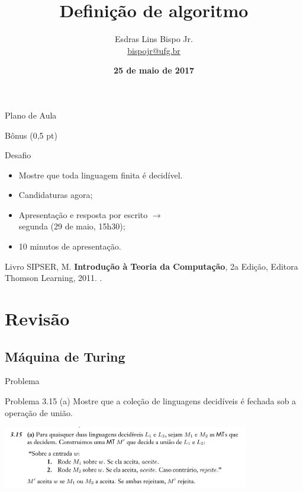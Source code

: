 \documentclass[xcolor=dvipsnames,table]{beamer}
\title{Definição de algoritmo}
\author{
  Esdras Lins Bispo Jr. \\ \url{bispojr@ufg.br}
  }
\institute{
  Teoria da Computação \\Bacharelado em Ciência da Computação}
\date{\textbf{25 de maio de 2017} }
\begin{document}
	\begin{frame}
		\titlepage
	\end{frame}

	\AtBeginSection{
		\begin{frame}{Sumário}%
    		\tableofcontents[currentsection]
		\end{frame}
	}

	\begin{frame}{Plano de Aula}
		\tableofcontents
	\end{frame}

	\begin{frame}{Bônus (0,5 pt)}
		\begin{block}{Desafio}
			\begin{itemize}
				\item Mostre que toda linguagem finita é decidível. 
				\item Candidaturas agora; 
				\item Apresentação e resposta por escrito $\rightarrow$ \\segunda (29 de maio, 15h30); 
				\item 10 minutos de apresentação.
			\end{itemize}
		\end{block} 
		\begin{block}{Livro}
			SIPSER, M. {\bf Introdução à Teoria da Computação}, 2a Edição, Editora Thomson Learning, 2011. \color{blue}{\bf Código Bib.: [004 SIP/int]}.
		\end{block}
	\end{frame}
    
    \section{Revisão}	
	\subsection{Máquina de Turing}
	\begin{frame}{Problema}
		\begin{block}{Problema 3.15 (a)}
			Mostre que a coleção de linguagens decidíveis é fechada sob a operação de união.		
		\end{block} 
		\begin{center}
			\includegraphics[height=2.7cm]{images/ex3-15a}
		\end{center}
	\end{frame}
	
\end{document}
